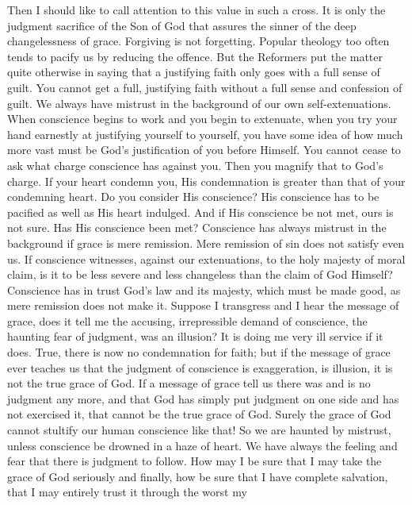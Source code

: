 \documentclass[12pt,letterpaper,oneside]{book}
\begin{document}
Then I should like to call attention to this 
value in such a cross. It is only the judgment 
sacrifice of the Son of God that assures the 
sinner of the deep changelessness of grace. 
Forgiving is not forgetting. Popular theology 
too often tends to pacify us by reducing the 
offence. But the Reformers put the matter quite 
otherwise in saying that a justifying faith only 
goes with a full sense of guilt. You cannot get 
a full, justifying faith without a full sense and 
confession of guilt. We always have mistrust 
in the background of our own self-extenuations. 
When conscience begins to work and you begin 
to extenuate, when you try your hand earnestly 
at justifying yourself to yourself, you have some 
idea of how much more vast must be God's 
justification of you before Himself. You cannot 
cease to ask what charge conscience has 
against you. Then you magnify that to God's 
charge. If your heart condemn you, His condemnation 
is greater than that of your condemning 
heart. Do you consider His conscience? 
His conscience has to be pacified as well as His 
heart indulged. And if His conscience be not 
met, ours is not sure. Has His conscience been 
met? Conscience has always mistrust in the 
background if grace is mere remission. Mere 
remission of sin does not satisfy even us. If 
conscience witnesses, against our extenuations, 
to the holy majesty of moral claim, is it to 
be less severe and less changeless than the 
claim of God Himself? Conscience has in trust 
God's law and its majesty, which must be made 
good, as mere remission does not make it. Suppose 
I transgress and I hear the message of 
grace, does it tell me the accusing, irrepressible 
demand of conscience, the haunting fear of 
judgment, was an illusion? It is doing me 
very ill service if it does. True, there is now 
no condemnation for faith; but if the message 
of grace ever teaches us that the judgment of 
conscience is exaggeration, is illusion, it is not 
the true grace of God. If a message of grace 
tell us there was and is no judgment any more, 
and that God has simply put judgment on 
one side and has not exercised it, that cannot 
be the true grace of God. Surely the grace of 
God cannot stultify our human conscience like 
that! So we are haunted by mistrust, unless 
conscience be drowned in a haze of heart. We 
have always the feeling and fear that there is 
judgment to follow. How may I be sure that I 
may take the grace of God seriously and finally, 
how be sure that I have complete salvation, that 
I may entirely trust it through the worst my 
\end{document}

